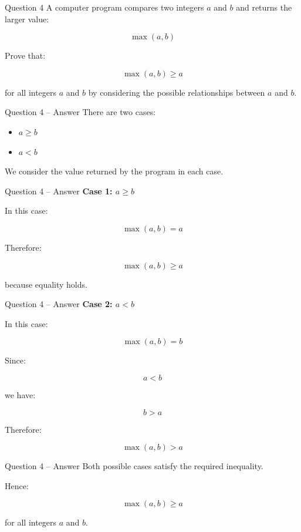 
\begin{frame}{Question 4}
A computer program compares two integers $a$ and $b$ and returns the
larger value:

$$
\max(a,b)
$$

Prove that:

$$
\max(a,b)\geq a
$$

for all integers $a$ and $b$ by considering the possible relationships
between $a$ and $b$.
\end{frame}

\begin{frame}{Question 4 -- Answer}
There are two cases:

\begin{itemize}
\item $a\geq b$
\item $a<b$
\end{itemize}

We consider the value returned by the program in each case.
\end{frame}

\begin{frame}{Question 4 -- Answer}
\textbf{Case 1: $a\geq b$}

In this case:

$$
\max(a,b)=a
$$

Therefore:

$$
\max(a,b)\geq a
$$

because equality holds.
\end{frame}

\begin{frame}{Question 4 -- Answer}
\textbf{Case 2: $a<b$}

In this case:

$$
\max(a,b)=b
$$

Since:

$$
a<b
$$

we have:

$$
b>a
$$

Therefore:

$$
\max(a,b)>a
$$

\end{frame}

\begin{frame}{Question 4 -- Answer}
Both possible cases satisfy the required inequality.

Hence:

$$
\boxed{\max(a,b)\geq a}
$$

for all integers $a$ and $b$.
\end{frame}

